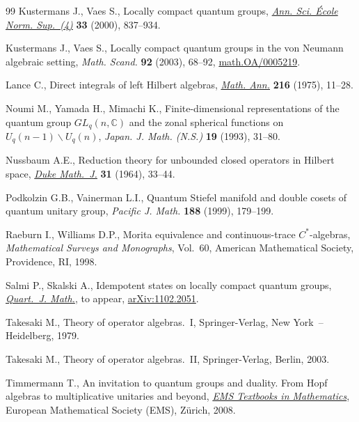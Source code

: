 \documentclass[pdftex]{sigma}
\numberwithin{equation}{section}
\theoremstyle{definition}
\begin{document}
\begin{thebibliography}{99}
 Kustermans  J., Vaes S.,
  Locally compact quantum groups,
\href{http://dx.doi.org/10.1016/S0012-9593(00)01055-7}{\emph{Ann. Sci. \'Ecole Norm. Sup.~(4)}} {\bf 33}  (2000), 837--934.

 Kustermans  J., Vaes S.,
  Locally compact quantum groups in the von Neumann algebraic setting,
  \emph{Math. Scand.} {\bf 92} (2003), 68--92,
\href{http://arxiv.org/abs/math.OA/0005219}{math.OA/0005219}.

  Lance C.,
  Direct integrals of left Hilbert algebras,
\href{http://dx.doi.org/10.1007/BF02547968}{\emph{Math. Ann.}}  {\bf 216}  (1975), 11--28.

  Noumi M., Yamada H., Mimachi K.,
 Finite-dimensional representations of the quantum group $GL_q(n, \mathbb{C})$ and the zonal spherical functions on $U_q(n-1)\backslash U_q(n)$,
   \emph{Japan. J. Math. (N.S.)} {\bf 19} (1993), 31--80.

  Nussbaum A.E.,
  Reduction theory for unbounded closed operators in Hilbert space,
\href{http://dx.doi.org/10.1215/S0012-7094-64-03103-5}{\emph{Duke Math.~J.}} {\bf 31} (1964), 33--44.



   Podkolzin  G.B., Vainerman L.I.,
    Quantum Stiefel manifold and double cosets of quantum unitary group,
   \emph{Pacific J. Math.}  {\bf 188}  (1999), 179--199.

   Raeburn  I., Williams D.P.,
     Morita equivalence and continuous-trace $C^\ast$-algebras,
{\it Mathematical Surveys and Monographs}, Vol.~60, American Mathematical Society, Providence, RI, 1998.

 Salmi P., Skalski A.,
 Idempotent states on locally compact quantum groups,
\href{http://dx.doi.org/10.1093/qmath/har023}{\emph{Quart.~J. Math.}}, to appear,
\href{http://arxiv.org/abs/1102.2051}{arXiv:1102.2051}.



  Takesaki M.,
  Theory of operator algebras.~I,
Springer-Verlag, New York~-- Heidelberg, 1979.

 Takesaki  M.,
  Theory of operator algebras.~II,
Springer-Verlag, Berlin, 2003.


Timmermann  T.,
An invitation to quantum groups and duality. From Hopf algebras to multiplicative unitaries and beyond,
\href{http://dx.doi.org/10.4171/043}{{\it EMS Textbooks in Mathematics}},  European Mathematical Society (EMS), Z\"urich, 2008.


\end{thebibliography}
\end{document}
